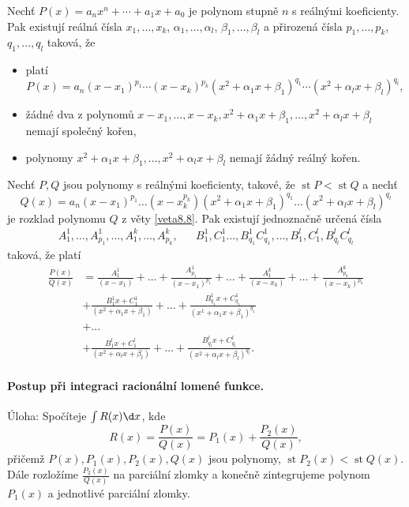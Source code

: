 \begin{veta}\label{veta8.8}
Nechť
$
P(x) = a_n x^n + \cdots + a_1 x + a_0
$
je polynom stupně $n$ s reálnými koeficienty. Pak existují reálná čísla $x_1,\dots,x_k$, $\alpha_1,\dots,\alpha_l$, $\beta_1,\dots,\beta_l$ a přirozená čísla $p_1,\dots,p_k$, $q_1,\dots,q_l$ taková, že
\begin{itemize}
	\item platí
	\[
P(x) = a_n (x-x_1)^{p_1}\cdots(x-x_k)^{p_k}
(x^2+\alpha_1 x+\beta_1)^{q_1}\cdots(x^2+\alpha_l x+\beta_l)^{q_l},
\]
\item žádné dva z polynomů $x-x_1, \dots, x-x_k, x^2+\alpha_1x+\beta_1, \dots, x^2+\alpha_lx+\beta_l$
nemají společný kořen,
\item polynomy $x^2+\alpha_1x+\beta_1, \dots, x^2+\alpha_lx+\beta_l$ nemají žádný reálný kořen.
\end{itemize}
\end{veta}

\begin{veta}\label{veta8.9}
Nechť $P,Q$ jsou polynomy s reálnými koeficienty, takové, že $\operatorname{st} P < \operatorname{st} Q$ a nechť
$$
Q(x) = a_n(x-x_1)^{p_1}\dots (x-x_k^{p_k})\left( x^2+\alpha_1x+\beta_1 \right )^{q_1}\dots \left( x^2+\alpha_l x + \beta_l \right )^{q_l}
$$
je rozklad polynomu $Q$ z věty \ref{veta8.8}. Pak existují jednoznačně určená čísla
\begin{align*}
A_1^1,\dots,A_{p_1}^1,\dots, A_1^{k},\dots,A_{p_k}^k, && B_1^1,C_1^1\dots, B_{q_1}^1C_{q_1}^1,\dots,B_1^l,C_1^l,B_{q_l}^lC_{q_l}^l
\end{align*}
taková, že platí
\begin{align*}
\frac{P(x)}{Q(x)} &= \frac{A_1^1}{(x-x_1)}+\dots + \frac{A_{p_1}^1}{(x-x_1)^{p_1}} + \dots + \frac{A_1^k}{(x-x_k)}+ \dots + \frac{A_{p_k}^k}{(x-x_k)^{p_k}}\\
&+ \frac{B_1^1 x+C_1^1}{(x^2+\alpha_1 x+\beta_1)}+\dots + \frac{B_{q_1}^1x+C_{q_1}^1}{(x^1+\alpha_1 x+\beta_1)^{q_1}}\\
&+  \dots \\
&+ \frac{B_1^l x+C_1^l}{(x^2+\alpha_l x+\beta_l)} + \dots + \frac{B_{q_l}^l x+C_{q_l}^l}{(x^2+\alpha_l x+\beta_l)^{q_l}}.
\end{align*}
\end{veta}

\paragraph{Postup při integraci racionální lomené funkce.} Úloha: Spočíteje $\int R(x) \d x$, kde
$$
    R(x) = \frac{P(x)}{Q(x)} = P_1(x) + \frac{P_2(x)}{Q(x)},
$$
přičemž $P(x), P_1(x), P_2(x), Q(x)$ jsou polynomy, $\operatorname{st} P_2(x) < \operatorname{st} Q(x)$.
Dále rozložíme $\frac{P_2(x)}{Q(x)}$ na parciální zlomky a konečně zintegrujeme polynom
$P_1(x)$ a jednotlivé parciální zlomky.


